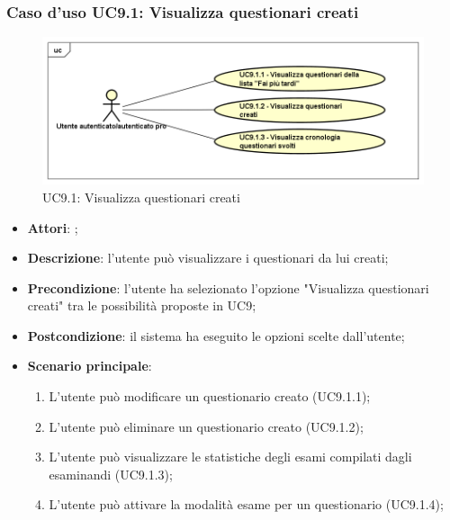 		\subsubsection{Caso d'uso UC9.1: Visualizza questionari creati}
		\label{UC9.1}
		\begin{figure}[h]
			\centering
		\includegraphics[scale=0.5,keepaspectratio]{UML/UC9_1.png}
			\caption{UC9.1: Visualizza questionari creati}
		\end{figure}
		\FloatBarrier
		\begin{itemize}
			\item \textbf{Attori}: \uaupro;
			\item \textbf{Descrizione}: l'utente può visualizzare i questionari da lui creati;
			\item \textbf{Precondizione}: l'utente ha selezionato l'opzione "Visualizza questionari creati" tra le possibilità proposte in UC9;
			\item \textbf{Postcondizione}: il sistema ha eseguito le opzioni scelte dall'utente;
			\item \textbf{Scenario principale}: 
				\begin{enumerate}
					\item L'utente può modificare un questionario creato (UC9.1.1);
					\item L'utente può eliminare un questionario creato (UC9.1.2);
					\item L'utente può visualizzare le statistiche degli esami compilati dagli esaminandi (UC9.1.3);
					\item L'utente può attivare la modalità esame per un questionario (UC9.1.4);
				\end{enumerate}
		\end{itemize}
		
